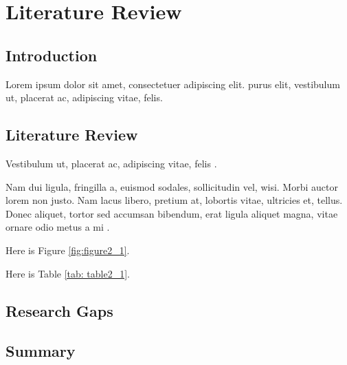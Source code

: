 
\chapter{Literature Review}\doublespacing %

\label{Chapter2} %


\section{Introduction}
Lorem ipsum dolor sit amet, consectetuer adipiscing elit. \cite{Rothman-2022} purus elit, vestibulum ut, placerat ac, adipiscing vitae, felis.
\lipsum[2]


\section{Literature Review}
Vestibulum ut, placerat ac, adipiscing vitae, felis \citep{li-1984}.

Nam dui ligula, fringilla a, euismod sodales, sollicitudin vel, wisi. Morbi auctor lorem
non justo. Nam lacus libero, pretium at, lobortis vitae, ultricies et, tellus. Donec
aliquet, tortor sed accumsan bibendum, erat ligula aliquet magna, vitae ornare odio
metus a mi \citep{li-1984, WHO-2018}.

Here is Figure \ref{fig:figure2_1}.



\lipsum[2]



\lipsum[2]



\lipsum[2]



\lipsum[1-2]
Here is Table \ref{tab: table2_1}.



\section{Research Gaps}
\lipsum[1-4]



\section{Summary}
\lipsum[2]






